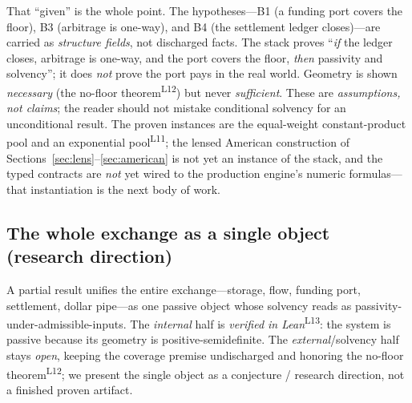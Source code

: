 \documentclass[runningheads]{llncs}
\newcommand{\tfp}{\emph{verified in Lean}}
\begin{document}
That ``given'' is the whole point. The hypotheses---B1 (a funding port covers the
floor), B3 (arbitrage is one-way), and B4 (the settlement ledger closes)---are
carried as \emph{structure fields}, not discharged facts. The stack proves
``\emph{if} the ledger closes, arbitrage is one-way, and the port covers the
floor, \emph{then} passivity and solvency''; it does \emph{not} prove the port
pays in the real world. Geometry is shown \emph{necessary} (the no-floor
theorem\textsuperscript{L12}) but never \emph{sufficient}. These are
\emph{assumptions, not claims}; the reader should not mistake conditional solvency
for an unconditional result. The proven instances are the equal-weight
constant-product pool and an exponential pool\textsuperscript{L11}; the lensed
American construction of Sections~\ref{sec:lens}--\ref{sec:american} is not yet an
instance of the stack, and the typed contracts are \emph{not} yet wired to the
production engine's numeric formulas---that instantiation is the next body of
work.

\subsection{The whole exchange as a single object (research direction)}
A partial result unifies the entire exchange---storage, flow, funding port,
settlement, dollar pipe---as one passive object whose solvency reads as
passivity-under-admissible-inputs. The \emph{internal} half is
\tfp{}\textsuperscript{L13}: the system is passive because its geometry is
positive-semidefinite. The \emph{external}/solvency half stays \emph{open},
keeping the coverage premise undischarged and honoring the no-floor
theorem\textsuperscript{L12}; we present the single object as a conjecture /
research direction, not a finished proven artifact.

\end{document}
